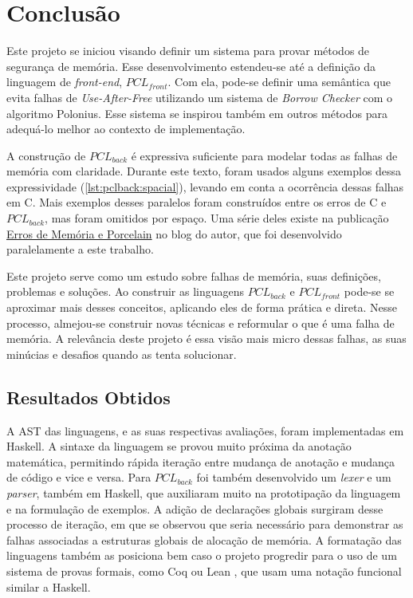 \chapter{Conclusão}

Este projeto se iniciou visando definir um sistema para provar métodos de segurança de memória. Esse desenvolvimento estendeu-se até a definição da linguagem de \emph{front-end}, $PCL_{front}$. Com ela, pode-se definir uma semântica que evita falhas de \emph{Use-After-Free} utilizando um sistema de \emph{Borrow Checker} com o algoritmo Polonius. Esse sistema se inspirou também em outros métodos para adequá-lo melhor ao contexto de implementação.

A construção de $PCL_{back}$ é expressiva suficiente para modelar todas as falhas de memória com claridade. Durante este texto, foram usados alguns exemplos dessa expressividade (\ref{lst:pclback:spacial}), levando em conta a ocorrência dessas falhas em C. Mais exemplos desses paralelos foram construídos entre os erros de C e $PCL_{back}$, mas foram omitidos por espaço. Uma série deles existe na publicação \href{https://sacolle.github.io/blog/posts/porcelain-emulando-os-erros-de-memoria-de-c/}{Erros de Memória e Porcelain} no blog do autor, que foi desenvolvido paralelamente a este trabalho.

Este projeto serve como um estudo sobre falhas de memória, suas definições, problemas e soluções. Ao construir as linguagens $PCL_{back}$ e $PCL_{front}$ pode-se se aproximar mais desses conceitos, aplicando eles de forma prática e direta. Nesse processo, almejou-se construir novas técnicas e reformular o que é uma falha de memória. A relevância deste projeto é essa visão mais micro dessas falhas, as suas minúcias e desafios quando as tenta solucionar.

\section{Resultados Obtidos}
A AST das linguagens, e as suas respectivas avaliações, foram implementadas em Haskell. A sintaxe da linguagem se provou muito próxima da anotação matemática, permitindo rápida iteração entre mudança de anotação e mudança de código e vice e versa. Para $PCL_{back}$ foi também desenvolvido um \emph{lexer} e um \emph{parser}, também em Haskell, que auxiliaram muito na prototipação da linguagem e na formulação de exemplos. A adição de declarações globais surgiram desse processo de iteração, em que se observou que seria necessário para demonstrar as falhas associadas a estruturas globais de alocação de memória. A formatação das linguagens também as posiciona bem caso o projeto progredir para o uso de um sistema de provas formais, como Coq \cite{COQ} ou Lean \cite{LEAN4}, que usam uma notação funcional similar a Haskell.
